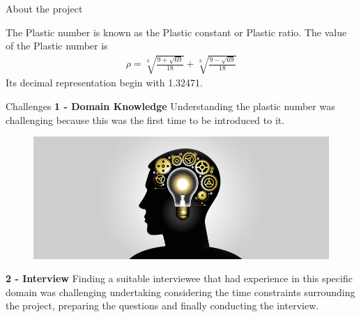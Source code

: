 \documentclass[final]{beamer}
\newlength{\onecolwid}
\begin{document}
\begin{frame}
\begin{columns}[t]
\begin{column}{\onecolwid}
\begin{exampleblock}{About the project}

The Plastic number is known as the Plastic constant or Plastic ratio.\newline
\newline The value of the Plastic number is\newline
\begin{eqnarray}
{\displaystyle \rho ={\sqrt[{3}]{\frac {9+{\sqrt {69}}}{18}}}+{\sqrt[{3}]{\frac {9-{\sqrt {69}}}{18}}}}
\end{eqnarray}
\newline Its decimal representation begin with 1.32471.

\end{exampleblock}

\begin{exampleblock}{Challenges}
\justifying
\textbf{1 - Domain Knowledge}\newline\newline
Understanding the plastic number was challenging because this was the first time to be introduced to it. \newline

\begin{figure}
\includegraphics[width=1\linewidth]{img/understanding}\newline
\end{figure}





\textbf{2 - Interview}\newline\newline
\justifying
Finding a suitable interviewee that had experience in this specific domain was challenging undertaking considering the time constraints surrounding the project, preparing the questions and finally conducting the interview.
\end{exampleblock}



\end{column}
\end{columns}
\end{frame}
\end{document}
